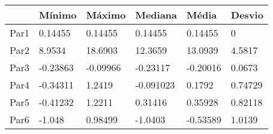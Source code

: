 \begin{tabular}{llllll}
& Mínimo & Máximo & Mediana & Média & Desvio \\ 
\hline 
Par1 & 0.14455 & 0.14455 & 0.14455 & 0.14455 & 0 \\ 
Par2 & 8.9534 & 18.6903 & 12.3659 & 13.0939 & 4.5817 \\ 
Par3 & -0.23863 & -0.09966 & -0.23117 & -0.20016 & 0.0673 \\ 
Par4 & -0.34311 & 1.2419 & -0.091023 & 0.1792 & 0.74729 \\ 
Par5 & -0.41232 & 1.2211 & 0.31416 & 0.35928 & 0.82118 \\ 
Par6 & -1.048 & 0.98499 & -1.0403 & -0.53589 & 1.0139 \\ 
\hline 
\end{tabular}